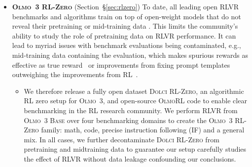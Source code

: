 \documentclass[table]{ai2style/ai2}
\newcommand{\newOlmo}{Olmo\xspace}
\newcommand{\olmothree}{\textsc{\newOlmo~3}\xspace}
\newcommand{\olmothreebase}{\textsc{\newOlmo~3 Base}\xspace}
\newcommand{\olmothreerl}{\textsc{\newOlmo{}RL}\xspace}
\newcommand{\olmothreerlzero}{\textsc{\newOlmo~3 RL-Zero}\xspace}
\newcommand{\dolciinstructsft}{\textsc{Dolci Instruct SFT}\xspace}
\newcommand{\dolciinstructdpo}{\textsc{Dolci Instruct DPO}\xspace}
\newcommand{\dolcirlzero}{\textsc{Dolci RL-Zero}\xspace}
\begin{document}
\begin{itemize}
\begin{itemize}[itemsep=2pt]
    \item[$\circ$] We introduce \dolciinstructsft, our new dataset enriched with data specifically created for function calling (Section~\S\ref{sec:tool-use-sft}). To directly optimize model interactivity on top of capabilities, we extend our Delta Learning preference pipeline in \dolciinstructdpo, incorporating multi-turn preference data and targeted data length interventions that encourage concise responses (Section~\S\ref{sec:dolci-instruct-dpo}). Finally, we use reinforcement learning with verifiable rewards (Section~\S\ref{sec:RLVR-instruct}) to further refine core capabilities, where preference tuning synergizes with RL to improve model performance while maintaining learned brevity.
\end{itemize}
\item {\bf \olmothreerlzero{}} (Section~\S\ref{sec:rlzero}) 
To date, all leading open RLVR benchmarks and algorithms train on top of open-weight models that do not reveal their pretraining or mid-training data \citep{scalingllama3,qwen3}.
This limits the community's ability to study the role of pretraining data on RLVR performance.
It can lead to myriad issues with benchmark evaluations being contaminated, e.g., mid-training data containing the evaluation, which makes spurious rewards as effective as true reward~\citep{shao2025spuriousrewardsrethinkingtraining,wu2025reasoning} or improvements from fixing prompt templates outweighing the improvements from RL~\citep{liu2025understanding}.
\begin{itemize}[itemsep=2pt]
    \item[$\circ$]  We therefore release a fully open dataset \dolcirlzero, an algorithmic RL zero setup for \olmothree, and open-source \olmothreerl code to enable clear benchmarking in the RL research community.
We perform RLVR from \olmothreebase over four benchmarking domains to create the \olmothreerlzero family: math, code, precise instruction following (IF) and a general mix.
In all cases, we further decontaminate \dolcirlzero from pretraining and midtraining data to guarantee our setup carefully studies the effect of RLVR without data leakage confounding our conclusions.
\end{itemize}
\end{itemize}
\end{document}
